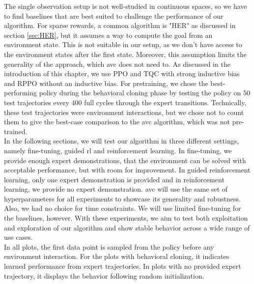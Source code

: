 The single observation setup is not well-studied in continuous spaces, so we have to find baselines that are best suited to challenge the performance of our algorithm. For sparse rewards, a common
algorithm is "HER" as discussed in section \ref{sec:HER}, but it assumes a way to compute the goal from an environment state. This is not suitable in our setup, as we don't have access to the environment
states after the first state. Moreover, this assumption limits the generality of the approach, which \ac{avc} does not need to.
As discussed in the introduction of this chapter, we use PPO and TQC with strong inductive bias and RPPO without an inductive bias. 
For pretraining, we chose the best-performing policy during the behavioral cloning phase by testing the policy on 50 test 
trajectories every 400 full cycles through the 
expert transitions. Technically, these test trajectories were environment interactions, but we chose not to count them to give the best-case comparison to the \ac{avc} algorithm, which was not pre-trained.\\

In the following sections, we will test our algorithm in three different settings, namely fine-tuning, guided \ac{rl} and reinforcement learning. In fine-tuning, we provide
enough expert demonstrations, that the environment can be solved with acceptable performance, but with room for improvement. In guided reinforcement learning,
only one expert demonstration is provided and in reinforcement learning, we provide no expert demonstration. \ac{avc} will use the same set of hyperparameters for all experiments to showcase its generality and robustness. Also, we had no choice for time constraints.
We will use limited fine-tuning for the baselines, however.
With these experiments, we aim to test both exploitation and exploration of our algorithm and show stable
behavior across a wide range of use cases. \\

In all plots, the first data point is sampled from the policy before any environment interaction. For the plots with behavioral cloning, it indicates learned performance from expert trajectories.
In plots with no provided expert trajectory, it displays the behavior following random initialization.

